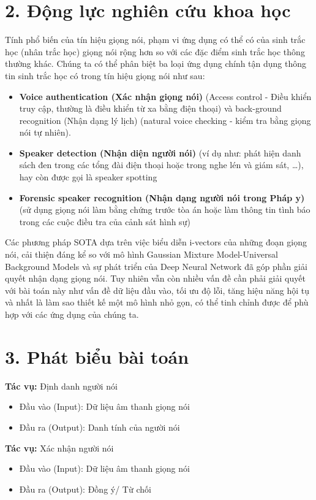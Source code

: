 \documentclass{article}
\begin{document}
	\section{2. Động lực nghiên cứu khoa học}
	\qquad Tính phổ biến của tín hiệu giọng nói, phạm vi ứng dụng có thể có của sinh trắc học (nhân trắc học) giọng nói rộng hơn so với các đặc điểm sinh trắc học thông thường khác. Chúng ta có thể phân biệt ba loại ứng dụng chính tận dụng thông tin sinh trắc học có trong tín hiệu giọng nói như sau:
	\begin{itemize}
		\item \textbf{Voice authentication (Xác nhận giọng nói)} (Access control - Điều khiển truy cập, thường là điều khiển từ xa bằng điện thoại) và back-ground recognition (Nhận dạng lý lịch) (natural voice checking - kiểm tra bằng giọng nói tự nhiên).
		\item \textbf{Speaker detection (Nhận diện người nói)} (ví dụ như: phát hiện danh sách đen trong các tổng đài điện thoại hoặc trong nghe lén và giám sát, …), hay còn được gọi là speaker spotting
		\item \textbf{Forensic speaker recognition (Nhận dạng người nói trong Pháp y)} (sử dụng giọng nói làm bằng chứng trước tòa án hoặc làm thông tin tình báo trong các cuộc điều tra của cảnh sát hình sự) 
	\end{itemize}
	\qquad Các phương pháp SOTA dựa trên việc biểu diễn i-vectors của những đoạn giọng nói, cải thiện đáng kể so với mô hình Gaussian Mixture Model-Universal Background Models và sự phát triển của Deep Neural Network đã góp phần giải quyết nhận dạng giọng nói. Tuy nhiên vẫn còn nhiều vấn đề cần phải giải quyết với bài toán này như vấn đề dữ liệu đầu vào, tối ưu độ lỗi, tăng hiệu năng hội tụ và nhất là làm sao thiết kế một mô hình nhỏ gọn, có thể tinh chỉnh được để phù hợp với các ứng dụng của chúng ta.
	
	\section{3. Phát biểu bài toán}
	
	\textbf{Tác vụ:} Định danh người nói
	\begin{itemize}
		\item Đầu vào (Input): Dữ liệu âm thanh giọng nói
		\item Đầu ra (Output): Danh tính của người nói
	\end{itemize}
	\textbf{Tác vụ:} Xác nhận người nói
	\begin{itemize}
		\item Đầu vào (Input): Dữ liệu âm thanh giọng nói
		\item Đầu ra (Output): Đồng ý/ Từ chối
	\end{itemize}
	
\end{document}
